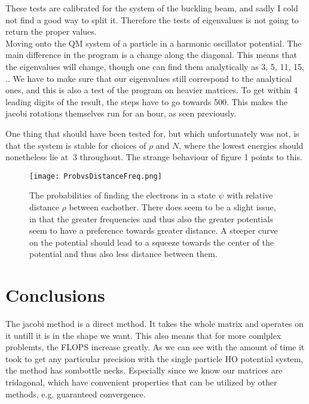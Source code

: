 \documentclass[10pt, twocolumn]{article}
\begin{document}
These tests are calibrated for the system of the buckling beam, and sadly I cold not find a good way to split it. 
Therefore the tests of eigenvalues is not going to return the proper values.\\

Moving onto the QM system of a particle in a harmonic oscillator potential. The main difference in the program is a change along the diagonal. 
This means that the eigenvalues will change, though one can find them analytically as 3, 5, 11, 15, ..\cite{project2pdf}
We have to make sure that our eigenvalues still correspond to the analytical ones, and this is also a test of the program on heavier matrices. 
To get within 4 leading digits of the result, the steps have to go towards 500. This makes the jacobi rotations themselves run for an hour, 
as seen previously.

One thing that should have been tested for, but which unfortunately was not, is that the system is stable for choices of $\rho$ and $N$, 
where the lowest energies should nonetheless lie at $~3$ throughout. The strange behaviour of figure 1 points to this. 

\begin{figure}[hbtp]
\texttt{[image: ProbvsDistanceFreq.png]}
\caption{The probabilities of finding the electrons in a state $\psi$ with relative distance $\rho$ between eachother.
        There does seem to be a slight issue, in that the greater frequencies and thus also the greater potentials 
        seem to have a preference towards greater distance. A steeper curve on the potential should lead to a squeeze 
        towards the center of the potential and thus also less distance between them.} 
\label{honestly, I don't know what label does}
\end{figure}

\section{Conclusions}
The jacobi method is a direct method. It takes the whole matrix and operates on it untill it is in the shape we want. 
This also means that for more comlplex problemts, the FLOPS increase greatly. As we can see with the amount of time it took to get any 
particular precision with the single particle HO potential system, the method has sombottle necks.  Especially since we know our 
matrices are tridagonal, which have convenient properties that can be utilized by other methods, e.g. guaranteed convergence.\\
\end{document}
